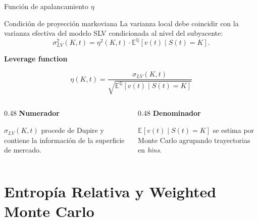 \documentclass[8pt]{beamer}
\begin{document}
\begin{frame}{Función de apalancamiento $\eta$}
\begin{block}{Condición de proyección markoviana}
La varianza local debe coincidir con la varianza efectiva del modelo SLV condicionada al nivel del subyacente:
\[
    \sigma_{LV}^2(K,t) = \eta^2(K,t)\cdot
    \mathbb{E}^{\mathbb Q}\left[v(t) \mid S(t)=K\right].
\]
\end{block}
\pause

\textbf{Leverage function}

\[
    \boxed{
    \eta(K,t) =
    \frac{\sigma_{LV}(K,t)}
    {\sqrt{\mathbb{E}^{\mathbb Q}\left[v(t) \mid S(t)=K\right]}}
    }
\]

\pause

\begin{columns}[T]
\begin{column}{0.48\textwidth}
\textbf{Numerador}

$\sigma_{LV}(K,t)$ procede de Dupire y contiene la información de la superficie de mercado.

\end{column}
\begin{column}{0.48\textwidth}
\textbf{Denominador}

$\mathbb{E}[v(t)\mid S(t)=K]$ se estima por Monte Carlo agrupando trayectorias en \textit{bins}.

\end{column}
\end{columns}
\end{frame}

\section{Entropía Relativa y Weighted Monte Carlo}
\end{document}
